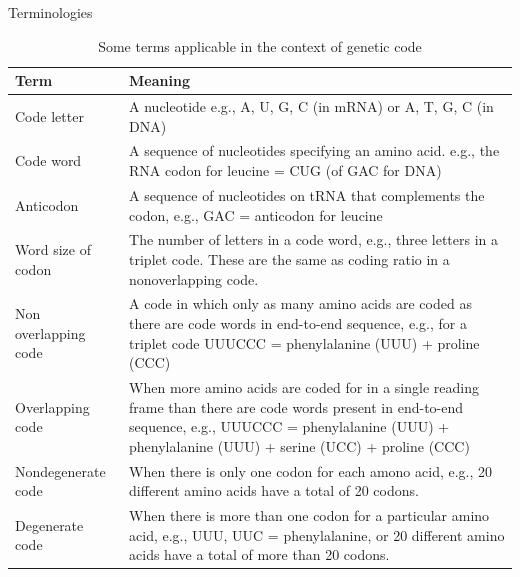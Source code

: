 \documentclass[11pt,dvipsnames,ignorenonframetext,aspectratio=169]{beamer}
\begin{document}
\begin{frame}{Terminologies}
\protect\hypertarget{terminologies}{}

\begin{table}[t]

\caption{\label{tab:gene-terms1}Some terms applicable in the context of genetic code}
\centering
\fontsize{6}{8}\selectfont
\begin{tabular}{>{\raggedright\arraybackslash}p{8em}>{\raggedright\arraybackslash}p{38em}}
\toprule
Term & Meaning\\
\midrule
\rowcolor{gray!6}  Code letter & A nucleotide e.g., A, U, G, C (in mRNA) or A, T, G, C (in DNA)\\
Code word & A sequence of nucleotides specifying an amino acid. e.g., the RNA codon for leucine = CUG (of GAC for DNA)\\
\rowcolor{gray!6}  Anticodon & A sequence of nucleotides on tRNA that complements the codon, e.g., GAC = anticodon for leucine\\
Word size of codon & The number of letters in a code word, e.g., three letters in a triplet code. These are the same as coding ratio in a nonoverlapping code.\\
\rowcolor{gray!6}  Non overlapping code & A code in which only as many amino acids are coded as there are code words in end-to-end sequence, e.g., for a triplet code UUUCCC = phenylalanine (UUU) + proline (CCC)\\
\addlinespace
Overlapping code & When more amino acids are coded for in a single reading frame than there are code words present in end-to-end sequence, e.g., UUUCCC = phenylalanine (UUU) + phenylalanine (UUU) + serine (UCC) + proline (CCC)\\
\rowcolor{gray!6}  Nondegenerate code & When there is only one codon for each amono acid, e.g., 20 different amino acids have a total of 20 codons.\\
Degenerate code & When there is more than one codon for a particular amino acid, e.g., UUU, UUC = phenylalanine, or 20 different amino acids have a total of more than 20 codons.\\
\bottomrule
\end{tabular}
\end{table}

\end{frame}
\end{document}
